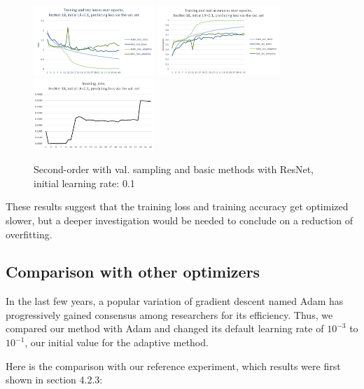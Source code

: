 \documentclass{article}
\begin{document}
  \begin{figure}[!h]
	\includegraphics[width=130pt]{loss_resnet_val_0_1.png}
	\includegraphics[width=130pt]{acc_resnet_val_0_1.png}
	\includegraphics[width=130pt]{lr_resnet_val_0_1.png}
	\caption{Second-order with val. sampling and basic methods with ResNet, initial learning rate: 0.1}
  \end{figure}

   These results suggest that the training loss and training accuracy get optimized slower, but a deeper investigation would be needed to conclude on a reduction of overfitting.   
  
  \subsection{Comparison with other optimizers}
  
  In the last few years, a popular variation of gradient descent named Adam \cite{kingma2014adam} has progressively gained consensus among researchers for its efficiency. Thus, we compared our method with Adam and changed its default learning rate of $10^{-3}$ to $10^{-1}$, our initial value for the adaptive method.
  
  Here is the comparison with our reference experiment, which results were first shown in section 4.2.3:\\ 
  
\end{document}
